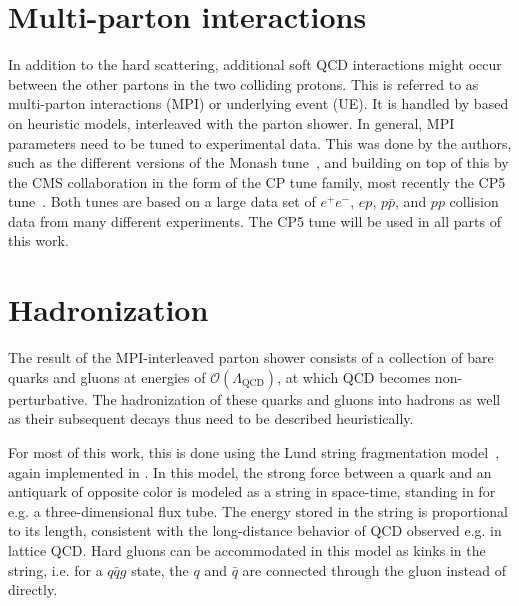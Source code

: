 


\section{Multi-parton interactions}
\label{sec:mc:mpi}

In addition to the hard scattering, additional soft QCD interactions might occur between the other partons in the two colliding protons. This is referred to as multi-parton interactions (MPI) or underlying event (UE). It is handled by \pythia based on heuristic models, interleaved with the parton shower. In general, MPI parameters need to be tuned to experimental data. This was done by the \pythia authors, such as the different versions of the Monash tune~\cite{Skands:2014pea}, and building on top of this by the CMS collaboration in the form of the CP tune family, most recently the CP5 tune~\cite{CMS:GEN-17-001}. Both tunes are based on a large data set of $e^+e^-$, $ep$, $p\bar{p}$, and $pp$ collision data from many different experiments. The CP5 tune will be used in all parts of this work.

\section{Hadronization}
\label{sec:mc:hadronization}

The result of the MPI-interleaved parton shower consists of a collection of bare quarks and gluons at energies of $\mathcal{O}(\Lambda_{\mathrm{QCD}})$, at which QCD becomes non-perturbative. The hadronization of these quarks and gluons into hadrons as well as their subsequent decays thus need to be described heuristically.

For most of this work, this is done using the Lund string fragmentation model~\cite{Andersson:1983ia,Sjostrand:1984ic}, again implemented in \pythia. In this model, the strong force between a quark and an antiquark of opposite color is modeled as a string in space-time, standing in for e.g. a three-dimensional flux tube. The energy stored in the string is proportional to its length, consistent with the long-distance behavior of QCD observed e.g. in lattice QCD. Hard gluons can be accommodated in this model as kinks in the string, i.e. for a $q\bar{q}g$ state, the $q$ and $\bar{q}$ are connected through the gluon instead of directly.

